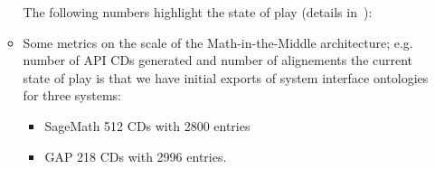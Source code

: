\begin{enumerate}
\begin{itemize}
      The following numbers highlight the state of play (details in~\cite{ODK-D6.8}):
    \item Some metrics on the scale of the Math-in-the-Middle architecture; e.g. number of
      API CDs generated and number of alignements the current state of play is that we
      have initial exports of system interface ontologies for three systems:
      \begin{itemize}
      \item SageMath 512 CDs with 2800 entries
      \item GAP 218 CDs with 2996 entries.
      \end{itemize}


\end{itemize}
\end{enumerate}

